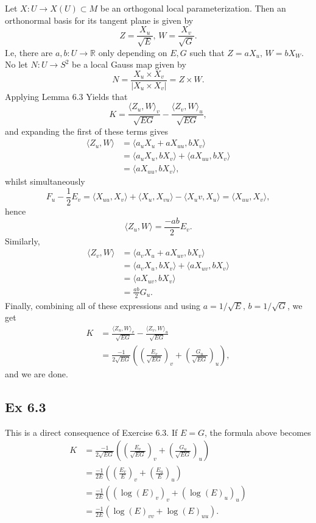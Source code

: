 \documentclass{article}
\theoremstyle{definition}
\newcommand{\R}{\mathbb{R}}
\begin{document}
Let $X : U \to X(U) \subset M$ be an orthogonal local parameterization.
Then an orthonormal basis for its tangent plane is given by
\[
	Z = \frac{X_u}{\sqrt{E}},\, 
	W = \frac{X_v}{\sqrt{G}}.
\] 
I.e, there are $a, b : U \to \R$ only depending on $E, G$ such that $Z = a
X_u,\, W = b X_W$. No let $N : U \to S^2$ be a local Gauss map given by
\[
	N 
	= 
	\frac{X_u \times X_v}{|X_u \times X_v|}
	=
	Z \times W.
\] 
Applying Lemma 6.3 Yields that 
\[
	K 
	=
	\frac{\langle Z_u, W \rangle_v}{\sqrt{EG}}
	-
	\frac{\langle Z_v, W \rangle_u}{\sqrt{EG}},
\] 
and expanding the first of these terms gives
\begin{align*}
	\langle Z_u, W \rangle
	&=
	\langle a_uX_u + aX_{uu}, bX_v \rangle \\
	&=
	\langle a_uX_u, bX_v \rangle +
	\langle aX_{uu}, bX_v \rangle \\
	&=
	\langle aX_{uu}, bX_v \rangle,
\end{align*}
whilst simultaneously
\[
	F_u - \frac{1}{2}E_v
	=
	\langle X_{uu}, X_v\rangle
	+
	\langle X_{u}, X_{vu} \rangle
	-
	\langle X_uv, X_u \rangle 
	=
	\langle X_{uu}, X_v\rangle,
\] 
hence 
\[
	\langle Z_u, W \rangle
	=
	\frac{-ab}{2} E_v.
\] 
Similarly, 
\begin{align*}
	\langle Z_v, W \rangle
	&=
	\langle a_vX_u + aX_{uv}, bX_v \rangle \\
	&=
	\langle a_vX_u, bX_v \rangle +
	\langle aX_{uv}, bX_v \rangle \\
	&=
	\langle aX_{uv}, bX_v \rangle \\
	&=
	\frac{ab}{2} G_u.
\end{align*}
Finally, combining all of these expressions and using $a = 1/\sqrt{E},\, b =
1/\sqrt{G}$, we get
\begin{align*}
	K
	&=
	\frac{\langle Z_u, W \rangle_v}{\sqrt{EG}}
	-
	\frac{\langle Z_v, W \rangle_u}{\sqrt{EG}} \\
	&=
	\frac{-1}{2 \sqrt{EG}}
	\left(
		\left(\frac{E_v}{\sqrt{EG}}\right)_v
		+
		\left(\frac{G_u}{\sqrt{EG}}\right)_u
	\right),
\end{align*}
and we are done.

\subsection*{Ex 6.3}

This is a direct consequence of Exercise 6.3. If $E = G$, the formula above becomes
\begin{align*}
	K
	&=
	\frac{-1}{2 \sqrt{EG}}
	\left(
		\left(\frac{E_v}{\sqrt{EG}}\right)_v
		+
		\left(\frac{G_u}{\sqrt{EG}}\right)_u
	\right) \\
	&=
	\frac{-1}{2 E}
	\left(
		\left(\frac{E_v}{E}\right)_v
		+
		\left(\frac{E_u}{E}\right)_u
	\right) \\
	&=
	\frac{-1}{2 E}
	\left(
		\left(\log(E)_v\right)_v
		+
		\left(\log(E)_u\right)_u
	\right) \\
	&=
	\frac{-1}{2 E}
	\left(
		\log(E)_{vv}
		+
		\log(E)_{uu}
	\right).
\end{align*}
\end{document}
